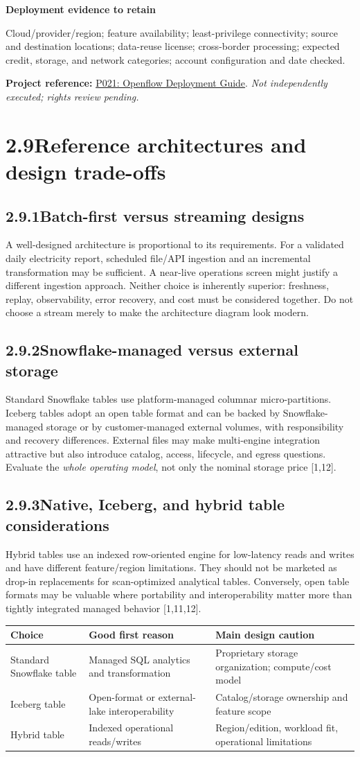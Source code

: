 \documentclass[11pt,twoside]{article}
\newcommand{\topic}[2]{\subsection*{#1\quad #2}}
\newcommand{\repo}[2]{\par\begingroup\fontsize{8.0}{9.6}\selectfont\sffamily\color{inkgray}\textbf{Project reference:} \href{#2}{#1}. \textit{Not independently executed; rights review pending.}\par\endgroup}
\begin{document}
\begin{whitebox}
\textbf{Deployment evidence to retain}\par
Cloud/provider/region; feature availability; least-privilege connectivity; source and destination locations; data-reuse license; cross-border processing; expected credit, storage, and network categories; account configuration and date checked.
\end{whitebox}
\repo{P021: Openflow Deployment Guide}{https://github.com/Snowflake-Labs/sfguide-getting-started-with-openflow-spcs}

\newpage
\section*{2.9\quad Reference architectures and design trade-offs}
\topic{2.9.1}{Batch-first versus streaming designs}
A well-designed architecture is proportional to its requirements. For a validated daily electricity report, scheduled file/API ingestion and an incremental transformation may be sufficient. A near-live operations screen might justify a different ingestion approach. Neither choice is inherently superior: freshness, replay, observability, error recovery, and cost must be considered together. Do not choose a stream merely to make the architecture diagram look modern.

\topic{2.9.2}{Snowflake-managed versus external storage}
Standard Snowflake tables use platform-managed columnar micro-partitions. Iceberg tables adopt an open table format and can be backed by Snowflake-managed storage or by customer-managed external volumes, with responsibility and recovery differences. External files may make multi-engine integration attractive but also introduce catalog, access, lifecycle, and egress questions. Evaluate the \emph{whole operating model}, not only the nominal storage price [1,12].

\topic{2.9.3}{Native, Iceberg, and hybrid table considerations}
Hybrid tables use an indexed row-oriented engine for low-latency reads and writes and have different feature/region limitations. They should not be marketed as drop-in replacements for scan-optimized analytical tables. Conversely, open table formats may be valuable where portability and interoperability matter more than tightly integrated managed behavior [1,11,12].

\begin{center}\small
\begin{tabularx}{\linewidth}{@{}p{23mm}X X@{}}\toprule
\textbf{Choice} & \textbf{Good first reason} & \textbf{Main design caution}\\\midrule
Standard Snowflake table & Managed SQL analytics and transformation & Proprietary storage organization; compute/cost model\\
Iceberg table & Open-format or external-lake interoperability & Catalog/storage ownership and feature scope\\
Hybrid table & Indexed operational reads/writes & Region/edition, workload fit, operational limitations\\
\bottomrule\end{tabularx}\end{center}
\end{document}
